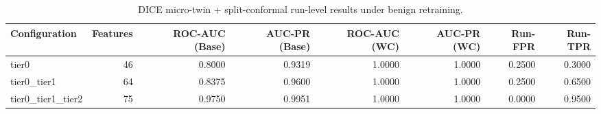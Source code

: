 \begin{table}[t]
\centering
\caption{DICE micro-twin + split-conformal run-level results under benign retraining.}
\label{tab:dice_full_overall}
\footnotesize
\begin{tabular}{lrrrrrrr}
\toprule
Configuration & Features & ROC-AUC (Base) & AUC-PR (Base) & ROC-AUC (WC) & AUC-PR (WC) & Run-FPR & Run-TPR \\
\midrule
tier0 & 46 & 0.8000 & 0.9319 & 1.0000 & 1.0000 & 0.2500 & 0.3000 \\
tier0_tier1 & 64 & 0.8375 & 0.9600 & 1.0000 & 1.0000 & 0.2500 & 0.6500 \\
tier0_tier1_tier2 & 75 & 0.9750 & 0.9951 & 1.0000 & 1.0000 & 0.0000 & 0.9500 \\
\bottomrule
\end{tabular}

\end{table}

